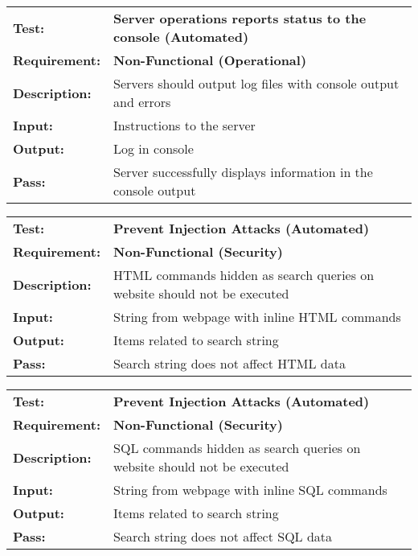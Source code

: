 \documentclass{article}
\begin{document}
	\begin{mdframed}[linewidth=1pt]
	\begin{tabularx}{\textwidth}{@{}p{3cm}X@{}}
	{\bf Test:} & {\bf Server operations reports status to the console (Automated)}\\[\baselineskip]
	{\bf Requirement:} & {\bf Non-Functional (Operational)}\\[\baselineskip]
	{\bf Description:} & Servers should output log files with console output and errors\\[0.5\baselineskip]
	{\bf Input:} &  Instructions to the server \\[0.5\baselineskip]
	{\bf Output:} & Log in console \\[0.5\baselineskip]
	{\bf Pass:} & Server successfully displays information in the console output
	\end{tabularx}
	\end{mdframed}


	\begin{mdframed}[linewidth=1pt]
	\begin{tabularx}{\textwidth}{@{}p{3cm}X@{}}
	{\bf Test:} & {\bf Prevent Injection Attacks (Automated)}\\[\baselineskip]
	{\bf Requirement:} & {\bf Non-Functional (Security)}\\[\baselineskip]
	{\bf Description:} & HTML commands hidden as search queries on website should not be executed\\[0.5\baselineskip]
	{\bf Input:} &  String from webpage with inline HTML commands \\[0.5\baselineskip]
	{\bf Output:} & Items related to search string \\[0.5\baselineskip]
	{\bf Pass:} & Search string does not affect HTML data
	\end{tabularx}
	\end{mdframed}

		
	\begin{mdframed}[linewidth=1pt]
	\begin{tabularx}{\textwidth}{@{}p{3cm}X@{}}
	{\bf Test:} & {\bf Prevent Injection Attacks (Automated)}\\[\baselineskip]
	{\bf Requirement:} & {\bf Non-Functional (Security)}\\[\baselineskip]
	{\bf Description:} & SQL commands hidden as search queries on website should not be executed\\[0.5\baselineskip]
	{\bf Input:} &  String from webpage with inline SQL commands \\[0.5\baselineskip]
	{\bf Output:} & Items related to search string \\[0.5\baselineskip]
	{\bf Pass:} & Search string does not affect SQL data
	\end{tabularx}
	\end{mdframed}
\end{document}
